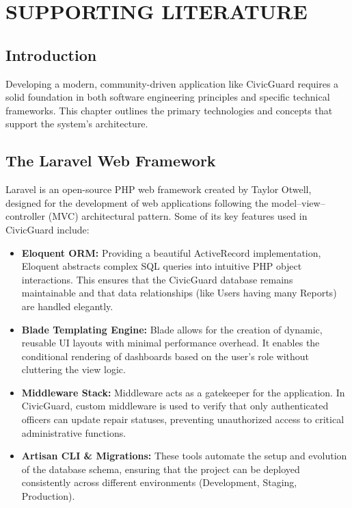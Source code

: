 \chapter{SUPPORTING LITERATURE}

\section{Introduction}
Developing a modern, community-driven application like CivicGuard requires a solid foundation in both software engineering principles and specific technical frameworks. This chapter outlines the primary technologies and concepts that support the system's architecture.

\section{The Laravel Web Framework}
Laravel is an open-source PHP web framework created by Taylor Otwell, designed for the development of web applications following the model–view–controller (MVC) architectural pattern. Some of its key features used in CivicGuard include:
\begin{itemize}
    \item \textbf{Eloquent ORM:} Providing a beautiful ActiveRecord implementation, Eloquent abstracts complex SQL queries into intuitive PHP object interactions. This ensures that the CivicGuard database remains maintainable and that data relationships (like Users having many Reports) are handled elegantly.
    \item \textbf{Blade Templating Engine:} Blade allows for the creation of dynamic, reusable UI layouts with minimal performance overhead. It enables the conditional rendering of dashboards based on the user's role without cluttering the view logic.
    \item \textbf{Middleware Stack:} Middleware acts as a gatekeeper for the application. In CivicGuard, custom middleware is used to verify that only authenticated officers can update repair statuses, preventing unauthorized access to critical administrative functions.
    \item \textbf{Artisan CLI \& Migrations:} These tools automate the setup and evolution of the database schema, ensuring that the project can be deployed consistently across different environments (Development, Staging, Production).
\end{itemize}

